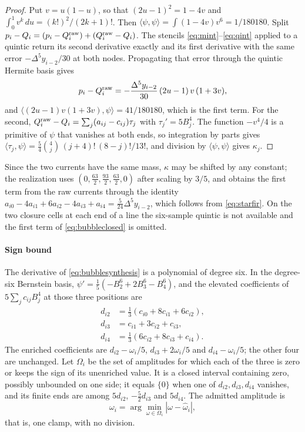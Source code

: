 \documentclass[journal]{IEEEtran}
\begin{document}
\begin{proof}
Put \(v=u(1-u)\), so that \((2u-1)^2=1-4v\) and
\(\int_0^1v^k\,du=(k!)^2/(2k+1)!\). Then
\(\langle\psi,\psi\rangle=\int(1-4v)v^6=1/180180\). Split
\(p_i-Q_i=(p_i-Q_i^{\rm raw})+(Q_i^{\rm raw}-Q_i)\). The stencils
\eqref{eq:mint}--\eqref{eq:qint} applied to a quintic return its second
derivative exactly and its first derivative with the same error
\(-\Delta^5y_{i-2}/30\) at both nodes. Propagating that error through the
quintic Hermite basis gives
\begin{equation}
 p_i-Q_i^{\rm raw}
 =-\frac{\Delta^5y_{i-2}}{30}\,(2u-1)\,v\,(1+3v),
 \label{eq:bubbleleading}
\end{equation}
and \(\langle(2u-1)v(1+3v),\psi\rangle=41/180180\), which is the first
term. For the second, \(Q_i^{\rm raw}-Q_i=\sum_j(a_{ij}-c_{ij})\tau_j\)
with \(\tau_j'=5B_j^4\). The function \(-v^4/4\) is a primitive of
\(\psi\) that vanishes at both ends, so integration by parts gives
\(\langle\tau_j,\psi\rangle=\tfrac54\binom4j\,(j+4)!\,(8-j)!/13!\),
and division by \(\langle\psi,\psi\rangle\) gives \(\kappa_j\).
\end{proof}

Since the two currents have the same mass, \(\kappa\) may be shifted by
any constant; the realization uses \((0,\tfrac{63}{2},\tfrac{93}{2},
\tfrac{63}{2},0)\) after scaling by \(3/5\), and obtains the first term
from the raw currents through the identity
\(a_{i0}-4a_{i1}+6a_{i2}-4a_{i3}+a_{i4}=\tfrac{5}{24}\Delta^5y_{i-2}\),
which follows from \eqref{eq:starfir}. On the two closure cells at each
end of a line the six-sample quintic is not available and the first term
of \eqref{eq:bubbleclosed} is omitted.

\paragraph{Sign bound}
The derivative of \eqref{eq:bubblesynthesis} is a polynomial of degree
six. In the degree-six Bernstein basis,
\(\psi'=\tfrac15(-B_2^6+2B_3^6-B_4^6)\), and the elevated coefficients
of \(5\sum_jc_{ij}B_j^4\) at those three positions are
\begin{align}
 d_{i2}&=\tfrac13(c_{i0}+8c_{i1}+6c_{i2}),\nonumber\\
 d_{i3}&=c_{i1}+3c_{i2}+c_{i3},\label{eq:bubbleelevated}\\
 d_{i4}&=\tfrac13(6c_{i2}+8c_{i3}+c_{i4}).\nonumber
\end{align}
The enriched coefficients are \(d_{i2}-\omega_i/5\),
\(d_{i3}+2\omega_i/5\) and \(d_{i4}-\omega_i/5\); the other four are
unchanged. Let \(\Omega_i\) be the set of amplitudes for which each of
the three is zero or keeps the sign of its unenriched value. It is a
closed interval containing zero, possibly unbounded on one side; it
equals \(\{0\}\) when one of \(d_{i2},d_{i3},d_{i4}\) vanishes, and its
finite ends are among \(5d_{i2}\), \(-\tfrac52d_{i3}\) and
\(5d_{i4}\). The admitted amplitude
is
\begin{equation}
 \omega_i=\arg\min_{\omega\in\Omega_i}|\omega-\widehat\omega_i|,
 \label{eq:bubbleclamp}
\end{equation}
that is, one clamp, with no division.
\end{document}
